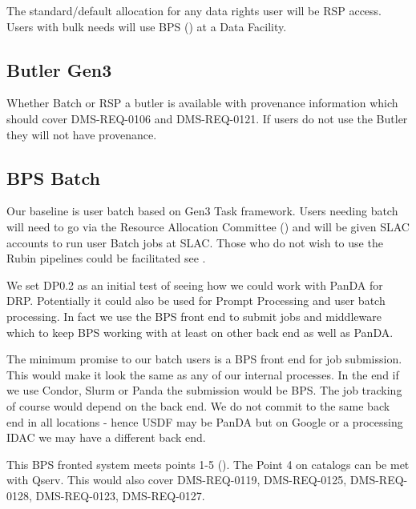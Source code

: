 The standard/default allocation for any data rights user will be RSP access.
Users with bulk needs will use BPS () at a Data Facility.


\subsection{Butler Gen3} \label{sec:gen3}

Whether Batch or RSP a butler is available with provenance information which should cover DMS-REQ-0106 and DMS-REQ-0121.
If users do not use the Butler they will not have provenance.

\subsection{BPS Batch }\label{sec:bpsbatch}

Our baseline is user batch based on Gen3 Task framework.
Users needing batch will need to go via the Resource Allocation Committee () and
will be given SLAC accounts to run user Batch jobs at SLAC.
Those who do not wish to use the Rubin pipelines could be facilitated see .


We set DP0.2 as an initial test of seeing how we could work with PanDA 
for DRP. Potentially it could also be used for Prompt Processing and user batch processing.
In fact we use the BPS front end to submit jobs and middleware which to keep BPS working with at least on other back end as well as PanDA.

The minimum promise to our batch users is a BPS front end for job submission.
This would make it look the same as any of our internal processes.
In the end if we use Condor, Slurm or Panda the submission would be BPS.
The job tracking of course would depend on the back end.
We do not commit to the same back end in all locations - hence USDF may be PanDA but on Google or a processing IDAC we may have a different back end.

This BPS fronted system meets  points 1-5 (). The Point 4 on catalogs can be met with Qserv.
This would also cover DMS-REQ-0119, DMS-REQ-0125, DMS-REQ-0128, DMS-REQ-0123, DMS-REQ-0127.

